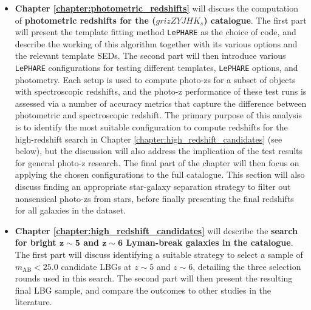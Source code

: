 \begin{itemize}
    \item \textbf{Chapter \ref{chapter:photometric_redshifts}} will discuss the computation of \textbf{photometric redshifts for the ($grizZYJHK_{s}$) \DESVIDEO catalogue}. The first part will present the template fitting method \texttt{LePHARE} as the choice of code, and describe the working of this algorithm together with its various options and the relevant template SEDs. The second part will then introduce various \texttt{LePHARE} configurations for testing different templates, \texttt{LePHARE} options, and photometry. Each setup is used to compute photo-zs for a subset of \DESVIDEO objects with spectroscopic redshifts, and the photo-z performance of these test runs is assessed via a number of accuracy metrics that capture the difference between photometric and spectroscopic redshift. The primary purpose of this analysis is to identify the most suitable configuration to compute redshifts for the high-redshift search in Chapter \ref{chapter:high_redshift_candidates} (see below), but the discussion will also address the implication of the test results for general photo-z research. The final part of the chapter will then focus on  applying the chosen configurations to the full \DESVIDEO catalogue. This section will also discuss finding an appropriate star-galaxy separation strategy to filter out nonsensical photo-zs from stars, before finally presenting the final redshifts for all galaxies in the \DESVIDEO dataset. 
    
    \item \textbf{Chapter \ref{chapter:high_redshift_candidates}} will describe the \textbf{search for bright $\mathbf{z\sim5}$ and $\mathbf{z\sim6}$ Lyman-break galaxies in the \DESVIDEO catalogue}. The first part will discuss identifying a suitable strategy to select a sample of $m_{\mathrm{AB}} < 25.0$ candidate LBGs at $z\sim5$ and $z\sim6$, detailing the three selection rounds used in this search. The second part will then present the resulting final LBG sample, and compare the outcomes to other studies in the literature. 
\end{itemize}

